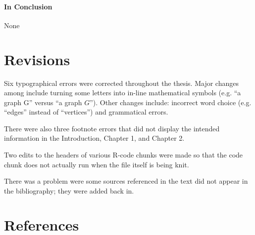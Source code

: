 \documentclass[12pt,twoside]{amherstthesis}
\begin{document}
\begin{Shaded}
\begin{Highlighting}[]
  
  
  
  \end{Highlighting}
  \end{Shaded}
  
  \subsubsection{In Conclusion}\label{in-conclusion}
  
  None
  
  \chapter{Revisions}\label{revisions}
  
  Six typographical errors were corrected throughout the thesis. Major
  changes among include turning some letters into in-line mathematical
  symbols (e.g. ``a graph G'' versus ``a graph \(G\)''). Other changes
  include: incorrect word choice (e.g. ``edges'' instead of ``vertices'')
  and grammatical errors.
  
  There were also three footnote errors that did not display the intended
  information in the Introduction, Chapter 1, and Chapter 2.
  
  Two edits to the headers of various R-code chunks were made so that the
  code chunk does not actually run when the file itself is being knit.
  
  There was a problem were some sources referenced in the text did not
  appear in the bibliography; they were added back in.
  
  \backmatter
  
  \chapter{References}\label{references}
  
\end{document}
